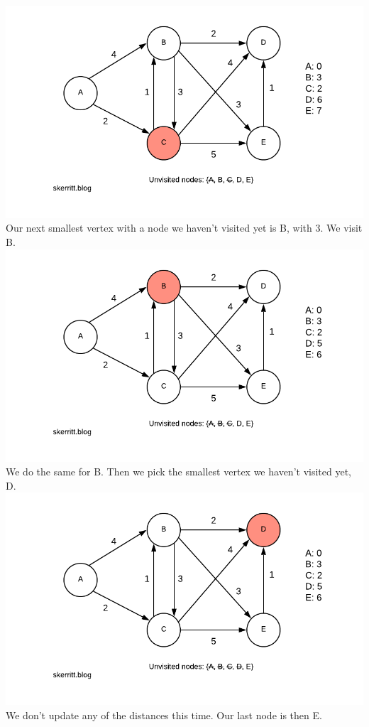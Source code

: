 \documentclass{article}
\begin{document}
\includegraphics{Blank-Diagram-40-.png}
Our next smallest vertex with a node we haven't visited yet is B, with 3. We visit B.
\includegraphics{Blank-Diagram-41-.png}
We do the same for B. Then we pick the smallest vertex we haven't visited yet, D.
\includegraphics{Blank-Diagram-42-.png}
We don't update any of the distances this time. Our last node is then E.
\end{document}
